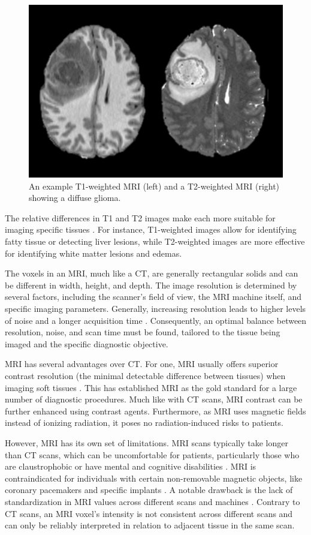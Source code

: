 \begin{figure}[!b]
 \centering
 \includegraphics[width=0.65\linewidth]{images/mri-t1-t2-example}
 \caption{An example T1-weighted MRI (left) and a T2-weighted MRI (right) showing a diffuse glioma. \cite{calabreseUniversityCaliforniaSan2022}}
 \label{fig:t1-t2-example}
 \end{figure}
 
 The relative differences in T1 and T2 images make each more suitable for imaging specific tissues \cite{boaventuraT1T2weightedRatio2022}. For instance, T1-weighted images allow for identifying fatty tissue or detecting liver lesions, while T2-weighted images are more effective for identifying white matter lesions and edemas.
 
 The voxels in an MRI, much like a CT, are generally rectangular solids and can be different in width, height, and depth. The image resolution is determined by several factors, including the scanner's field of view, the MRI machine itself, and specific imaging parameters. Generally, increasing resolution leads to higher levels of noise and a longer acquisition time \cite{macovskiNoiseMRI1996}. Consequently, an optimal balance between resolution, noise, and scan time must be found, tailored to the tissue being imaged and the specific diagnostic objective.
 
 MRI has several advantages over CT. For one, MRI usually offers superior contrast resolution (the minimal detectable difference between tissues) when imaging soft tissues \cite{changMagneticResonanceImaging1987}. This has established MRI as the gold standard for a large number of diagnostic procedures. Much like with CT scans, MRI contrast can be further enhanced using contrast agents. Furthermore, as MRI uses magnetic fields instead of ionizing radiation, it poses no radiation-induced risks to patients.
 
However, MRI has its own set of limitations. MRI scans typically take longer than CT scans, which can be uncomfortable for patients, particularly those who are claustrophobic or have mental and cognitive disabilities \cite{thorpeClaustrophobiaMRIRole2008}. MRI is contraindicated for individuals with certain non-removable magnetic objects, like coronary pacemakers and specific implants \cite{steccoPatientSafetyIssues2007}. A notable drawback is the lack of standardization in MRI values across different scans and machines \cite{wahidIntensityStandardizationMethods2021}. Contrary to CT scans, an MRI voxel's intensity is not consistent across different scans and can only be reliably interpreted in relation to adjacent tissue in the same scan.

